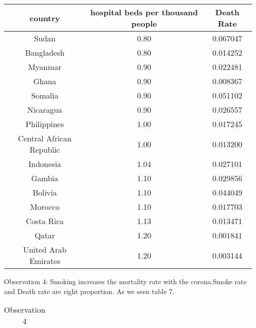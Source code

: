 \documentclass[a4 paper]{article}
\newcommand{\0}{\mathbf{0}}
\begin{document}
\begin{itemize}
\begin{table}[!ht]
\begin{tabular}{|c|c|c|}
	    country & hospital beds per thousand people & Death Rate\\\hline
        Sudan & 0.80 & 0.067047\\\hline
        Bangladesh & 0.80 & 0.014252\\\hline
        Myanmar & 0.90 & 0.022481\\\hline
        Ghana & 0.90 & 0.008367\\\hline
        Somalia & 0.90 & 0.051102\\\hline
        Nicaragua & 0.90 & 0.026557\\\hline
        Philippines & 1.00 & 0.017245\\\hline
        Central African Republic & 1.00 & 0.013200\\\hline
        Indonesia & 1.04 & 0.027101\\\hline
        Gambia & 1.10 & 0.029856\\\hline
        Bolivia & 1.10 & 0.044049\\\hline
        Morocco & 1.10 & 0.017703\\\hline
        Costa Rica & 1.13 & 0.013471\\\hline
        Qatar & 1.20 & 0.001841\\\hline
        United Arab Emirates & 1.20 & 0.003144\\\hline
	
	\end{tabular}
    \end{table}

	Observation 4:\newline
	Smoking increases the mortality rate with the corona.Smoke rate and Death rate are 
    right proportion.\newline 
    As we seen table 7.\newline
	
	\begin{table}[!ht]
    \centering
    \caption{Observation 4}
    \label{tab:Ob4}
    \begin{tabular}{|c|c|c|}
    \hline
	

\end{tabular}
\end{table}
\end{itemize}
\end{document}
